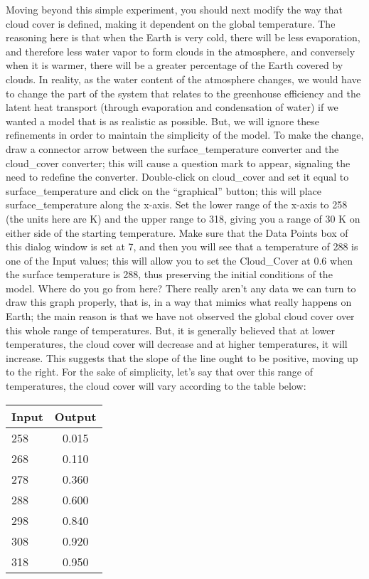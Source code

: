 \documentclass[11pt,letterpaper]{article}
\begin{document}
Moving beyond this simple experiment, you should next modify the way that cloud cover is defined, making it dependent on the global
temperature. The reasoning here is that when the Earth is very cold, there will be less evaporation, and therefore less water vapor to form
clouds in the atmosphere, and conversely when it is warmer, there will be a greater percentage of the Earth covered by clouds. In
reality, as the water content of the atmosphere changes, we would have to change the part of the system that relates to the greenhouse
efficiency and the latent heat transport (through evaporation and condensation of water) if we wanted a model that is as realistic as
possible. But, we will ignore these refinements in order to maintain the simplicity of the model.
To make the change, draw a connector arrow between the surface\_temperature converter and the cloud\_cover converter; this will cause a
question mark to appear, signaling the need to redefine the converter. Double-click on cloud\_cover and set it equal to surface\_temperature
and click on the ``graphical'' button; this will place surface\_temperature along the x-axis. Set the lower range of the x-axis to 258 (the
units here are K) and the upper range to 318, giving you a range of 30 K on either side of the starting temperature. Make sure that the
Data Points box of this dialog window is set at 7, and then you will see that a temperature of 288 is one of the Input values; this will
allow you to set the Cloud\_Cover at 0.6 when the surface temperature is 288, thus preserving the initial conditions of the model.
Where do you go from here? There really aren't any data we can turn to draw this graph properly, that is, in a way that mimics what
really happens on Earth; the main reason is that we have not observed the global cloud cover over this whole range of temperatures.
But, it is generally believed that at lower temperatures, the cloud cover will decrease and at higher temperatures, it will increase. This suggests that the slope of the line ought to be positive, moving up to the right. For the sake of simplicity,
let's say that over this range of temperatures, the cloud cover will vary according to the table below:

\begin{table}[h]
\begin{tabular}{lc}
Input & Output\\
\hline
258 & 0.015\\
268 & 0.110\\
278 & 0.360\\
288 & 0.600\\
298 & 0.840\\
308 & 0.920\\
318 & 0.950\\
\hline
\end{tabular}
\end{table}
\end{document}
